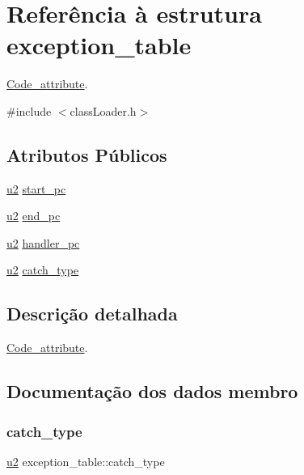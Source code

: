 \hypertarget{structexception__table}{}\section{Referência à estrutura exception\+\_\+table}
\label{structexception__table}


\hyperlink{struct_code__attribute}{Code\+\_\+attribute}.  




{\ttfamily \#include $<$class\+Loader.\+h$>$}

\subsection*{Atributos Públicos}
\begin{DoxyCompactItemize}
\item 
\hyperlink{util_8h_a55ef8d87fd202b8417704c089899c5b9}{u2} \hyperlink{structexception__table_a63da93a2b0f5dc61b3a158a0c7384602}{start\+\_\+pc}
\item 
\hyperlink{util_8h_a55ef8d87fd202b8417704c089899c5b9}{u2} \hyperlink{structexception__table_aeb4c86c92f02d6fccd52a0a9be9c5dac}{end\+\_\+pc}
\item 
\hyperlink{util_8h_a55ef8d87fd202b8417704c089899c5b9}{u2} \hyperlink{structexception__table_a8fe6fb5063598ad0d48aab5e617d6a35}{handler\+\_\+pc}
\item 
\hyperlink{util_8h_a55ef8d87fd202b8417704c089899c5b9}{u2} \hyperlink{structexception__table_ade50b30a987f3d3452a6de69eee0ada5}{catch\+\_\+type}
\end{DoxyCompactItemize}


\subsection{Descrição detalhada}
\hyperlink{struct_code__attribute}{Code\+\_\+attribute}. 

\subsection{Documentação dos dados membro}
\mbox{\label{structexception__table_ade50b30a987f3d3452a6de69eee0ada5}} 
\subsubsection{\texorpdfstring{catch\+\_\+type}{catch\_type}}
{\footnotesize\ttfamily \hyperlink{util_8h_a55ef8d87fd202b8417704c089899c5b9}{u2} exception\+\_\+table\+::catch\+\_\+type}


